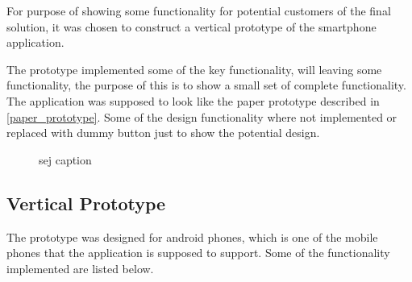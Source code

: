 For purpose of showing some functionality for potential customers of the final solution, it was chosen to construct a vertical prototype of the smartphone application.

The prototype implemented some of the key functionality, will leaving some functionality, the purpose of this is to show a small set of complete functionality. The application was supposed to look like the paper prototype described in \cref{paper_prototype}. Some of the design functionality where not implemented or replaced with dummy button just to show the potential design.  

\begin{figure}[h!]
  \centering
  \caption{sej caption}
\end{figure}

\subsection{Vertical Prototype}
\label{sub:vertical_prototype}
The prototype was designed for android phones, which is one of the mobile phones that the application is supposed to support. Some of the functionality implemented are listed below. 


